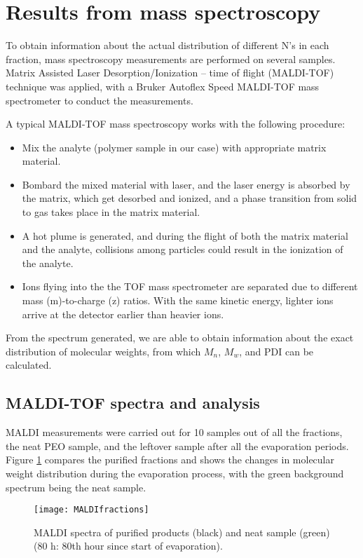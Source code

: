 \section{Results from mass spectroscopy}

To obtain information about the actual distribution of different N's in each fraction, mass spectroscopy measurements are performed on several samples. Matrix Assisted Laser Desorption/Ionization – time of flight (MALDI-TOF) technique was applied, with a Bruker Autoflex Speed MALDI-TOF mass spectrometer to conduct the measurements.

A typical MALDI-TOF mass spectroscopy works with the following procedure:

\begin{itemize}
\item Mix the analyte (polymer sample in our case) with appropriate matrix material.
\item Bombard the mixed material with laser, and the laser energy is absorbed by the matrix, which get desorbed and ionized, and a phase transition from solid to gas takes place in the matrix material.
\item A hot plume is generated, and during the flight of both the matrix material and the analyte, collisions among particles could result in the ionization of the analyte.
\item Ions flying into the the TOF mass spectrometer are separated due to different mass (m)-to-charge (z) ratios. With the same kinetic energy, lighter ions arrive at the detector earlier than heavier ions.
\end{itemize}

From the spectrum generated, we are able to obtain information about the exact distribution of molecular weights, from which $M_{n}$, $M_{w}$, and PDI can be calculated.

\subsection{MALDI-TOF spectra and analysis}

MALDI measurements were carried out for 10 samples out of all the fractions, the neat PEO sample, and the leftover sample after all the evaporation periods. Figure \ref{fig:MALDIfractions} compares the purified fractions and shows the changes in molecular weight distribution during the evaporation process, with the green background spectrum being the neat sample.

\begin{figure}[H]
\center
\texttt{[image: MALDIfractions]}
\caption{MALDI spectra of purified products (black) and neat sample (green) (80 h: 80th hour since start of evaporation).}
\label{fig:MALDIfractions}
\end{figure}

